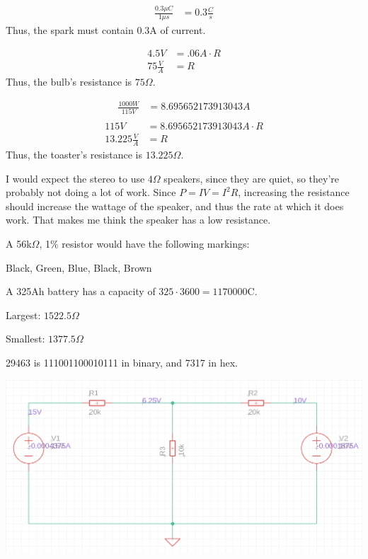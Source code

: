 \documentclass{article}
\begin{document}
\pagecolor{black}
\color{white}

\begin{align*}
    \frac{0.3\mu C}{1\mu s} &= 0.3 \frac Cs
\end{align*} Thus, the spark must contain $0.3$A of current.

\bigskip
{}
\begin{align*}
    4.5V &= .06A \cdot R \\
    75 \frac VA &= R
\end{align*} Thus, the bulb's resistance is $75 \Omega$.

\bigskip
{}
\begin{align*}
    \frac{1000 W}{115 V} &= 8.695652173913043A \\
\end{align*}
\begin{align*}
    115V &= 8.695652173913043A \cdot R \\
    13.225 \frac{V}{A} &= R
\end{align*} Thus, the toaster's resistance is $13.225\Omega$.

\bigskip
{}

    I would expect the stereo to use $4\Omega$ speakers, since they are quiet, so they're probably not doing a lot of work. Since $P= IV = I^2R$, increasing the resistance should increase the wattage of the speaker, and thus the rate at which it does work. That makes me think the speaker has a low resistance.

\bigskip
{}

    A 56k$\Omega$, 1\% resistor would have the following markings:

        Black, Green, Blue, Black, Brown

\bigskip
{}

\bigskip
{}

    A 325Ah battery has a capacity of $325 \cdot 3600 = 1170000$C.

\bigskip
{}

    Largest: $1522.5\Omega$

    Smallest: $1377.5\Omega$

\bigskip
{}

    29463 is 111001100010111 in binary, and 7317 in hex.

\newpage
{}

\begin{center}
    \includegraphics[scale=.5]{hw-1-eagle.png}
\end{center}
\end{document}
